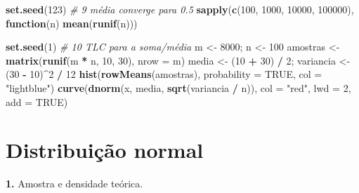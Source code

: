 \documentclass[
  portuguese,
  11pt,
  openany]{book}
\newenvironment{Shaded}{\begin{snugshade}}{\end{snugshade}}
\newcommand{\AttributeTok}[1]{\textcolor[rgb]{0.13,0.29,0.53}{#1}}
\newcommand{\CommentTok}[1]{\textcolor[rgb]{0.56,0.35,0.01}{\textit{#1}}}
\newcommand{\ConstantTok}[1]{\textcolor[rgb]{0.56,0.35,0.01}{#1}}
\newcommand{\ControlFlowTok}[1]{\textcolor[rgb]{0.13,0.29,0.53}{\textbf{#1}}}
\newcommand{\DecValTok}[1]{\textcolor[rgb]{0.00,0.00,0.81}{#1}}
\newcommand{\FunctionTok}[1]{\textcolor[rgb]{0.13,0.29,0.53}{\textbf{#1}}}
\newcommand{\NormalTok}[1]{#1}
\newcommand{\OtherTok}[1]{\textcolor[rgb]{0.56,0.35,0.01}{#1}}
\newcommand{\SpecialCharTok}[1]{\textcolor[rgb]{0.81,0.36,0.00}{\textbf{#1}}}
\newcommand{\StringTok}[1]{\textcolor[rgb]{0.31,0.60,0.02}{#1}}
\begin{document}
\begin{Shaded}
\begin{Highlighting}[]
\FunctionTok{set.seed}\NormalTok{(}\DecValTok{123}\NormalTok{)                                     }\CommentTok{\# 9 média converge para 0.5}
\FunctionTok{sapply}\NormalTok{(}\FunctionTok{c}\NormalTok{(}\DecValTok{100}\NormalTok{, }\DecValTok{1000}\NormalTok{, }\DecValTok{10000}\NormalTok{, }\DecValTok{100000}\NormalTok{),}
       \ControlFlowTok{function}\NormalTok{(n) }\FunctionTok{mean}\NormalTok{(}\FunctionTok{runif}\NormalTok{(n)))}

\FunctionTok{set.seed}\NormalTok{(}\DecValTok{1}\NormalTok{)                                       }\CommentTok{\# 10 TLC para a soma/média}
\NormalTok{m }\OtherTok{\textless{}{-}} \DecValTok{8000}\NormalTok{; n }\OtherTok{\textless{}{-}} \DecValTok{100}
\NormalTok{amostras }\OtherTok{\textless{}{-}} \FunctionTok{matrix}\NormalTok{(}\FunctionTok{runif}\NormalTok{(m }\SpecialCharTok{*}\NormalTok{ n, }\DecValTok{10}\NormalTok{, }\DecValTok{30}\NormalTok{), }\AttributeTok{nrow =}\NormalTok{ m)}
\NormalTok{media }\OtherTok{\textless{}{-}}\NormalTok{ (}\DecValTok{10} \SpecialCharTok{+} \DecValTok{30}\NormalTok{) }\SpecialCharTok{/} \DecValTok{2}\NormalTok{; variancia }\OtherTok{\textless{}{-}}\NormalTok{ (}\DecValTok{30} \SpecialCharTok{{-}} \DecValTok{10}\NormalTok{)}\SpecialCharTok{\^{}}\DecValTok{2} \SpecialCharTok{/} \DecValTok{12}
\FunctionTok{hist}\NormalTok{(}\FunctionTok{rowMeans}\NormalTok{(amostras), }\AttributeTok{probability =} \ConstantTok{TRUE}\NormalTok{, }\AttributeTok{col =} \StringTok{"lightblue"}\NormalTok{)}
\FunctionTok{curve}\NormalTok{(}\FunctionTok{dnorm}\NormalTok{(x, media, }\FunctionTok{sqrt}\NormalTok{(variancia }\SpecialCharTok{/}\NormalTok{ n)), }\AttributeTok{col =} \StringTok{"red"}\NormalTok{, }\AttributeTok{lwd =} \DecValTok{2}\NormalTok{, }\AttributeTok{add =} \ConstantTok{TRUE}\NormalTok{)}
\end{Highlighting}
\end{Shaded}

\section{Distribuição normal}\label{distribuiuxe7uxe3o-normal-1}

\textbf{1.} Amostra e densidade teórica.
\end{document}
